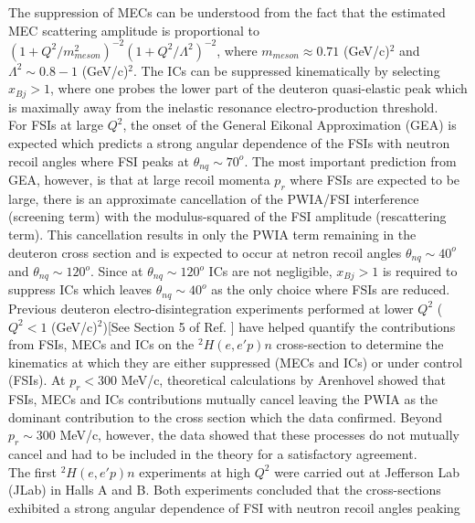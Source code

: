 The suppression of MECs can be understood from the fact that the estimated MEC scattering amplitude is proportional to  $(1 + Q^{2}/m^{2}_{meson})^{-2}(1+Q^{2}/\Lambda^{2})^{-2}$, where $m_{meson}\approx0.71$ (GeV/c)$^{2}$ and
$\Lambda^{2}\sim 0.8-1 $ (GeV/c)$^{2}$\cite{Sargsian_2001}. The ICs can be suppressed kinematically by selecting $x_{Bj}>1$, where one probes the lower part of the deuteron quasi-elastic peak which is maximally away from the inelastic resonance
electro-production threshold. \\
\indent For FSIs at large $Q^{2}$, the onset of the General Eikonal Approximation (GEA)\cite{Sargsian_2001,PhysRevC.56.1124,sargsian_2015} is expected which predicts a strong angular dependence of the FSIs with neutron recoil angles where FSI peaks at $\theta_{nq}\sim70^{o}$. The
most important prediction from GEA, however, is that at large recoil momenta $p_{r}$ where FSIs are expected to be large, there is an approximate cancellation of the PWIA/FSI interference (screening term) with the
modulus-squared of the FSI amplitude (rescattering term). This cancellation results in only the PWIA term remaining in the deuteron cross section and is expected to occur at netron recoil angles $\theta_{nq}\sim40^{o}$ and $\theta_{nq}\sim120^{o}$. Since at $\theta_{nq}\sim120^{o}$ ICs are not negligible, $x_{Bj}>1$ is required to suppress ICs which leaves $\theta_{nq}\sim40^{o}$ as the only choice where FSIs are reduced. \\
\indent Previous deuteron electro-disintegration experiments performed at lower $Q^{2}$ ($Q^{2}<1$ (GeV/c)$^{2}$)[See Section 5 of Ref. \cite{sargsian_2015}] have helped quantify the contributions from FSIs, MECs and ICs on
the $^{2}H(e,e'p)n$ cross-section to determine the kinematics at which they are either suppressed (MECs and ICs) or under control (FSIs).  At $p_{r}<300$ MeV/c, theoretical
calculations by Arenhovel\cite{Arenhovel_1976} showed that FSIs, MECs and ICs contributions mutually cancel leaving the PWIA as the dominant contribution to the cross section which
the data confirmed. Beyond $p_{r}\sim300$ MeV/c, however, the data showed that these processes do not mutually cancel and had to be included in the theory for a satisfactory agreement. \\
\indent The first $^{2}H(e,e'p)n$ experiments at high $Q^{2}$ were carried out at Jefferson Lab (JLab) in Halls A\cite{PhysRevLett.89.062301} and B\cite{PhysRevLett.98.262502}. Both
experiments concluded that the cross-sections exhibited a strong angular dependence of FSI with neutron recoil angles peaking
